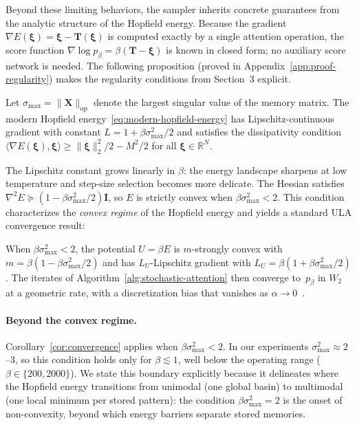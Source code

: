 Beyond these limiting behaviors, the sampler inherits concrete guarantees from the analytic structure of the Hopfield energy. Because the gradient $\nabla E(\boldsymbol{\xi})=\boldsymbol{\xi}-\mathbf{T}(\boldsymbol{\xi})$ is computed exactly by a single attention operation, the score function $\nabla\log p_\beta = \beta(\mathbf{T}-\boldsymbol{\xi})$ is known in closed form; no auxiliary score network is needed. The following proposition (proved in Appendix~\ref{app:proof-regularity}) makes the regularity conditions from Section~3 explicit.

\begin{proposition}\label{prop:regularity}
Let $\sigma_{\max}=\|\mathbf{X}\|_{\mathrm{op}}$ denote the largest singular value of the memory matrix. The modern Hopfield energy~\eqref{eq:modern-hopfield-energy} has Lipschitz-continuous gradient with constant $L = 1 + \beta\sigma_{\max}^{2}/2$ and satisfies the dissipativity condition $\langle \nabla E(\boldsymbol{\xi}),\boldsymbol{\xi}\rangle \ge \|\boldsymbol{\xi}\|_2^2/2 - M^2/2$ for all $\boldsymbol{\xi}\in\mathbb{R}^N$.
\end{proposition}

The Lipschitz constant grows linearly in $\beta$: the energy landscape sharpens at low temperature and step-size selection becomes more delicate. The Hessian satisfies $\nabla^2 E \succeq (1-\beta\sigma_{\max}^{2}/2)\mathbf{I}$, so $E$ is strictly convex when $\beta\sigma_{\max}^{2}<2$. This condition characterizes the \emph{convex regime} of the Hopfield energy and yields a standard ULA convergence result:

\begin{corollary}\label{cor:convergence}
When $\beta\sigma_{\max}^{2}<2$, the potential $U=\beta E$ is $m$-strongly convex with $m=\beta(1-\beta\sigma_{\max}^{2}/2)$ and has $L_{U}$-Lipschitz gradient with $L_{U}=\beta(1+\beta\sigma_{\max}^{2}/2)$. The iterates of Algorithm~\ref{alg:stochastic-attention} then converge to~$p_\beta$ in $W_2$ at a geometric rate, with a discretization bias that vanishes as $\alpha\to 0$~\cite{dalalyanTheoreticalGuaranteesApproximate2017,durmusNonasymptoticAnalysisUnadjusted2017}.
\end{corollary}

\paragraph{Beyond the convex regime.}
Corollary~\ref{cor:convergence} applies when $\beta\sigma_{\max}^{2}<2$. In our experiments $\sigma_{\max}^{2}\approx 2$--$3$, so this condition holds only for $\beta\lesssim 1$, well below the operating range ($\beta\in\{200,2000\}$). We state this boundary explicitly because it delineates where the Hopfield energy transitions from unimodal (one global basin) to multimodal (one local minimum per stored pattern): the condition $\beta\sigma_{\max}^{2}=2$ is the onset of non-convexity, beyond which energy barriers separate stored memories.

